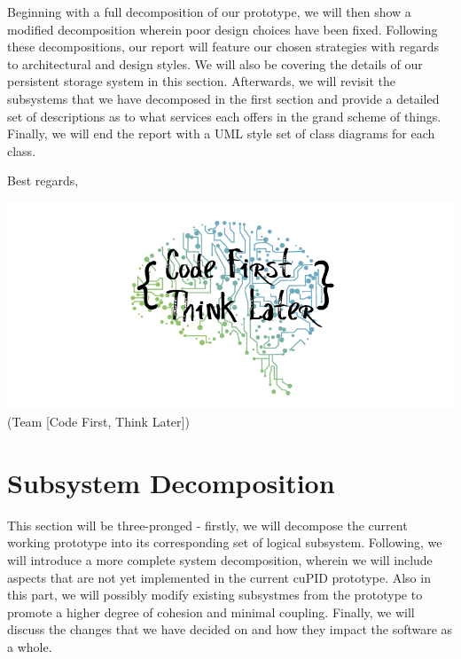\documentclass[12pt,letterpaper]{article}
\begin{document}
Beginning with a full decomposition of our prototype, we will then show a modified decomposition wherein poor design choices have been fixed. Following these decompositions, our report will feature our chosen strategies with regards to architectural and design styles. We will also be covering the details of our persistent storage system in this section. Afterwards, we will revisit the subsystems that we have decomposed in the first section and provide a detailed set of descriptions as to what services each offers in the grand scheme of things. Finally, we will end the report with a UML style set of class diagrams for each class.

\vspace{1em}

\noindent Best regards,

\vspace{1em}

\begin{center}
	\includegraphics[scale=0.4]{imgs/logo.png} \\ \footnotesize{(Team [Code First, Think Later])}
\end{center}

\section{Subsystem Decomposition}

This section will be three-pronged - firstly, we will decompose the current working prototype into its corresponding set of logical subsystem. Following, we will introduce a more complete system decomposition, wherein we will include aspects that are not yet implemented in the current cuPID prototype. Also in this part, we will possibly modify existing subsystmes from the prototype to promote a higher degree of cohesion and minimal coupling. Finally, we will discuss the changes that we have decided on and how they impact the software as a whole. 
\end{document}
